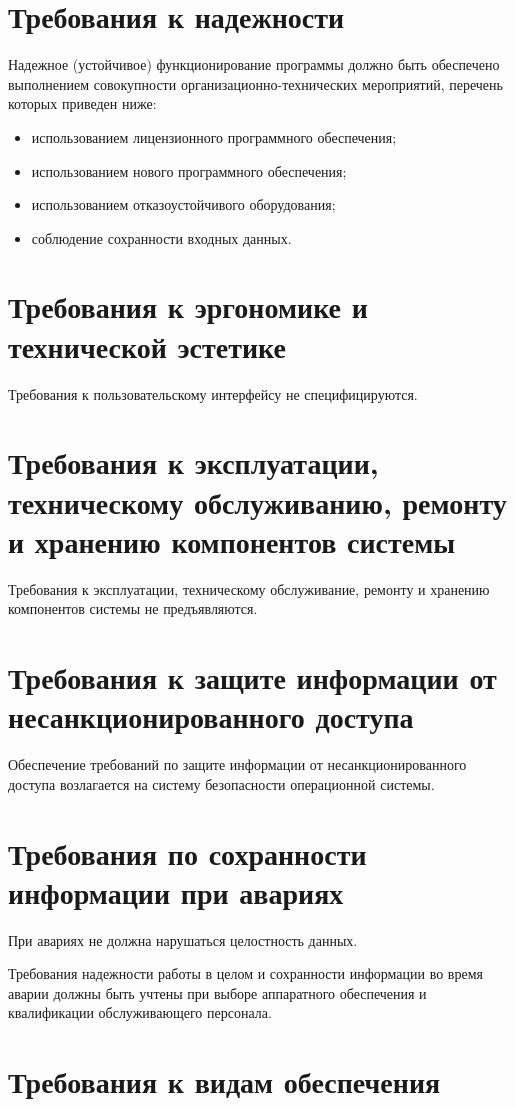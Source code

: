\section{Требования к надежности}
Надежное (устойчивое) функционирование программы должно быть обеспечено выполнением совокупности 
организационно-технических мероприятий, перечень которых приведен ниже: 
\begin{itemize}
    \item использованием лицензионного программного обеспечения; 
    \item использованием нового программного обеспечения;
    \item использованием отказоустойчивого оборудования;
    \item соблюдение сохранности входных данных.
\end{itemize}

\section{Требования к эргономике и технической эстетике}
Требования к пользовательскому интерфейсу не специфицируются.

\section{Требования к эксплуатации, техническому обслуживанию, ремонту и хранению компонентов системы}
Требования к эксплуатации, техническому обслуживание, ремонту и хранению компонентов системы 
не предъявляются.

\section{Требования к защите информации от несанкционированного доступа}
Обеспечение требований по защите информации от несанкционированного доступа возлагается на систему 
безопасности операционной системы.

\section{Требования по сохранности информации при авариях}
При авариях не должна нарушаться целостность данных. 

Требования надежности работы в целом и сохранности информации во время аварии должны быть 
учтены при выборе аппаратного обеспечения и квалификации обслуживающего персонала.

\section{Требования к видам обеспечения}
